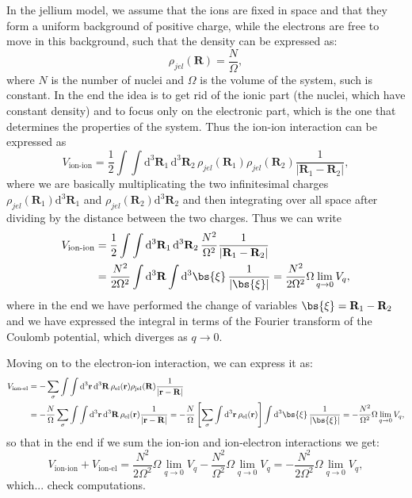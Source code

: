 In the jellium model, we assume that the ions are fixed in space and that they form a uniform background of positive charge, while the electrons are free to move in this background, such that the density can be expressed as:
\[
    \rho_{jel} (\mathbf{R}) = \frac{N}{\Omega},
\]
where \(N\) is the number of nuclei and \(\Omega\) is the volume of the system, such is constant. In the end the idea is to get rid of the ionic part (the nuclei, which have constant density) and to focus only on the electronic part, which is the one that determines the properties of the system. Thus the ion-ion interaction can be expressed as
\[
    V_{\text{ion-ion}} = \frac{1}{2} \int \int \mathrm{d}^3 \mathbf{R}_1 \, \mathrm{d}^3 \mathbf{R}_2 \, \rho_{jel}(\mathbf{R}_1) \rho_{jel}(\mathbf{R}_2) \frac{1}{|\mathbf{R}_1 - \mathbf{R}_2|},
\]
where we are basically multiplicating the two infinitesimal charges \(\rho_{jel}(\mathbf{R}_1) \mathrm{d}^3 \mathbf{R}_1\) and \(\rho_{jel}(\mathbf{R}_2) \mathrm{d}^3 \mathbf{R}_2\) and then integrating over all space after dividing by the distance between the two charges. Thus we can write
\[
    \begin{aligned}
        V_{\text{ion-ion}} & = \frac{1}{2} \int \int \mathrm{d}^3 \mathbf{R}_1 \, \mathrm{d}^3 \mathbf{R}_2 \, \frac{N^2}{\Omega^2} \frac{1}{|\mathbf{R}_1 - \mathbf{R}_2|}               \\
                           & = \frac{N^2}{2 \Omega^2} \int \mathrm{d}^3 \mathbf{R} \int \mathrm{d}^3 \bs{\xi} \, \frac{1}{|\bs{\xi}|} = \frac{N^2}{2 \Omega^2} \Omega \lim_{q \to 0} V_q,
    \end{aligned}
\]
where in the end we have performed the change of variables \(\bs{\xi} = \mathbf{R}_1 - \mathbf{R}_2\) and we have expressed the integral in terms of the Fourier transform of the Coulomb potential, which diverges as \(q \to 0\).

Moving on to the electron-ion interaction, we can express it as:
\[
    \begin{aligned}
        V_{\text{ion-el}} & = - \sum_{\sigma} \int \int \mathrm{d}^3 \mathbf{r} \, \mathrm{d}^3 \mathbf{R} \, \rho_{\text{el}}(\mathbf{r}) \rho_{\text{jel}}(\mathbf{R}) \frac{1}{|\mathbf{r} - \mathbf{R}|}                                                                                                                                                                                                        \\
                          & = - \frac{N}{\Omega} \sum_{\sigma} \int \int \mathrm{d}^3 \mathbf{r} \, \mathrm{d}^3 \mathbf{R} \, \rho_{\text{el}}(\mathbf{r}) \frac{1}{|\mathbf{r} - \mathbf{R}|} = -\frac{N}{\Omega} \left[ \sum_{\sigma} \int \mathrm{d}^3 \mathbf{r} \, \rho_{\text{el}}(\mathbf{r}) \right] \int \mathrm{d}^3 \bs{\xi} \, \frac{1}{|\bs{\xi}|} = -\frac{N^2}{\Omega^2} \Omega \lim_{q \to 0} V_q,
    \end{aligned}
\]
so that in the end if we sum the ion-ion and ion-electron interactions we get:
\[
    V_{\text{ion-ion}} + V_{\text{ion-el}} = \frac{N^2}{2 \Omega^2} \Omega \lim_{q \to 0} V_q - \frac{N^2}{\Omega^2} \Omega \lim_{q \to 0} V_q = -\frac{N^2}{2 \Omega^2} \Omega \lim_{q \to 0} V_q,
\]
which... check computations. 

